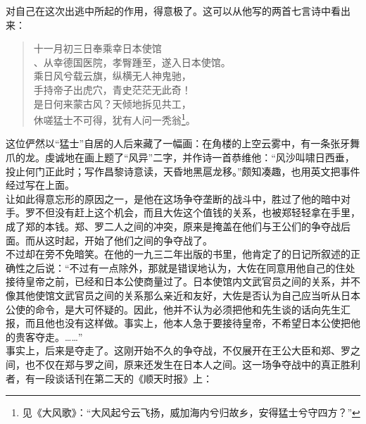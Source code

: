 对自己在这次出逃中所起的作用，得意极了。这可以从他写的两首七言诗中看出来：\\

\begin{quote}
	十一月初三日奉乘幸日本使馆\\

、从幸德国医院，孝臀踵至，遂入日本使馆。\\

乘日风兮载云旗，纵横无人神鬼驰，\\

手持帝子出虎穴，青史茫茫无此奇！\\

是日何来蒙古风？天倾地拆见共工，\\

休嗟猛士不可得，犹有人问一秃翁\footnote{见《大风歌》：“大风起兮云飞扬，威加海内兮归故乡，安得猛士兮守四方？”}。\\
\end{quote}

这位俨然以“猛士”自居的人后来藏了一幅画：在角楼的上空云雾中，有一条张牙舞爪的龙。虔诚地在画上题了“风异”二字，并作诗一首恭维他：“风沙叫啸日西垂，投止何门正此时；写作昌黎诗意读，天昏地黑扈龙移。”颇知凑趣，也用英文把事件经过写在上面。\\

让如此得意忘形的原因之一，是他在这场争夺垄断的战斗中，胜过了他的暗中对手。罗不但没有赶上这个机会，而且大佐这个值钱的关系，也被郑轻轻拿在手里，成了郑的本钱。郑、罗二人之间的冲突，原来是掩盖在他们与王公们的争夺战后面。而从这时起，开始了他们之间的争夺战了。\\

不过却在旁不免暗笑。在他的一九三二年出版的书里，他肯定了的日记所叙述的正确性之后说：“不过有一点除外，那就是错误地认为，大佐在同意用他自己的住处接待皇帝之前，已经和日本公使商量过了。日本使馆内文武官员之间的关系，并不像其他使馆文武官员之间的关系那么亲近和友好，大佐是否认为自己应当听从日本公使的命令，是大可怀疑的。因此，他并不认为必须把他和先生谈的话向先生汇报，而且他也没有这样做。事实上，他本人急于要接待皇帝，不希望日本公使把他的贵客夺走。……”\\

事实上，后来是夺走了。这刚开始不久的争夺战，不仅展开在王公大臣和郑、罗之间，也不仅在郑与罗之间，原来还发生在日本人之间。这一场争夺战中的真正胜利者，有一段谈话刊在第二天的《顺天时报》上：\\

